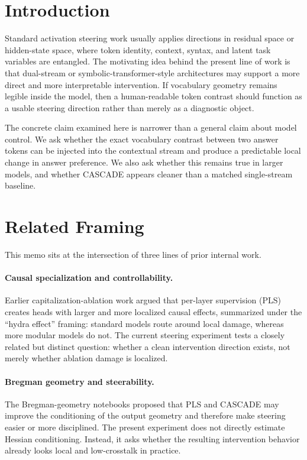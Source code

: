 \documentclass[11pt]{article}
\begin{document}
\section{Introduction}

Standard activation steering work usually applies directions in residual space
or hidden-state space, where token identity, context, syntax, and latent task
variables are entangled. The motivating idea behind the present line of work is
that dual-stream or symbolic-transformer-style architectures may support a more
direct and more interpretable intervention. If vocabulary geometry remains
legible inside the model, then a human-readable token contrast should function
as a usable steering direction rather than merely as a diagnostic object.

The concrete claim examined here is narrower than a general claim about model
control. We ask whether the exact vocabulary contrast between two answer tokens
can be injected into the contextual stream and produce a predictable local
change in answer preference. We also ask whether this remains true in larger
models, and whether CASCADE appears cleaner than a matched single-stream
baseline.

\section{Related Framing}

This memo sits at the intersection of three lines of prior internal work.

\paragraph{Causal specialization and controllability.}
Earlier capitalization-ablation work argued that per-layer supervision (PLS)
creates heads with larger and more localized causal effects, summarized under
the ``hydra effect'' framing: standard models route around local damage,
whereas more modular models do not. The current steering experiment tests a
closely related but distinct question: whether a clean intervention direction
exists, not merely whether ablation damage is localized.

\paragraph{Bregman geometry and steerability.}
The Bregman-geometry notebooks proposed that PLS and CASCADE may improve the
conditioning of the output geometry and therefore make steering easier or more
disciplined. The present experiment does not directly estimate Hessian
conditioning. Instead, it asks whether the resulting intervention behavior
already looks local and low-crosstalk in practice.
\end{document}
